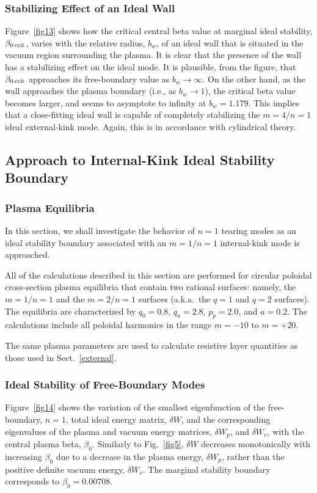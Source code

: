 \documentclass[12pt,prb,aps]{revtex4-1}
\begin{document}
\subsubsection{Stabilizing Effect of an Ideal Wall}\label{stabw1}
Figure~\ref{fig13} shows how the critical central beta value at marginal ideal stability, $\beta_{0\,{\rm crit}}$, varies with the
relative radius, $b_w$, of an ideal wall that is situated in the vacuum region surrounding the plasma. It is clear that the
presence of the wall has a stabilizing effect on the ideal mode.  It is plausible, from
the figure, that $\beta_{0\,{\rm crit}}$ approaches its free-boundary value as $b_w\rightarrow \infty$. On the other hand,
as the wall approaches the plasma boundary (i.e., as $b_w\rightarrow 1$), the critical beta value becomes larger, and seems
to asymptote to infinity at $b_w=1.179$. This implies that a close-fitting ideal wall is capable of completely stabilizing the
$m=4/n=1$ ideal external-kink mode. Again, this is in accordance with cylindrical theory.\cite{freidberg,wesson}

\subsection{Approach to Internal-Kink Ideal Stability Boundary}
\subsubsection{Plasma Equilibria}
In this section, we shall investigate the behavior of $n=1$ tearing modes as an ideal stability boundary associated with an  $m=1/n=1$ internal-kink mode is approached. 

All of the calculations described in this section are performed for circular poloidal cross-section plasma equilibria that contain two rational surfaces: namely, the $m=1/n=1$ and the $m=2/n=1$ surfaces (a.k.a.\ the $q=1$ and $q=2$ surfaces). 
The equilibria are  characterized by $q_0=0.8$, $q_a=2.8$, $p_p=2.0$, and $a=0.2$. The calculations include all poloidal harmonics in the range $m=-10$ to $m=+20$. 

The same  plasma parameters  are used to calculate resistive layer quantities as those used in Sect.~\ref{external}. 

\subsubsection{Ideal Stability of Free-Boundary Modes}
Figure~\ref{fig14} shows the variation of the smallest eigenfunction of the free-boundary, $n=1$, 
total ideal energy matrix, $\delta W$, and the corresponding eigenvalues of the plasma and vacuum energy matrices, $\delta W_p$, and $\delta W_v$, with the
central plasma beta, $\beta_0$. Similarly to Fig.~\ref{fig5}, $\delta W$ decreases monotonically with increasing $\beta_0$  due
to a decrease in the plasma energy, $\delta W_p$, rather than the positive definite vacuum energy, $\delta W_v$. 
 The marginal stability boundary corresponds to $\beta_0=0.00708$.  
\end{document}
